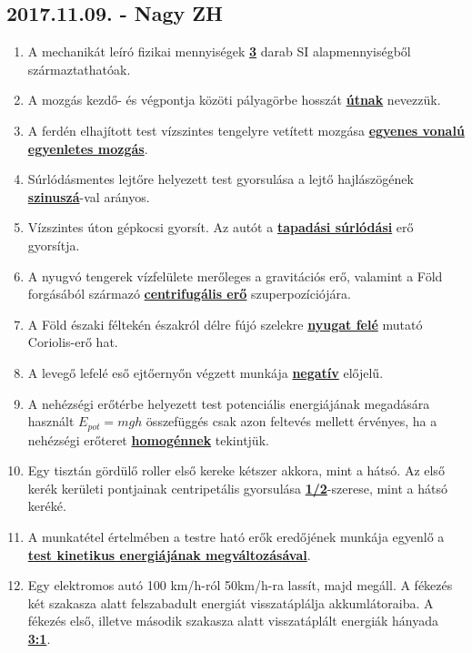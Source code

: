 \documentclass[../../fizika_kerdesek.tex]{subfiles}
\begin{document}
    \subsection{2017.11.09. - Nagy ZH}

        \begin{enumerate}
            \item A mechanikát leíró fizikai mennyiségek \underline{\textbf{3}} darab SI alapmennyiségből származtathatóak.
            \item A mozgás kezdő- és végpontja közöti pályagörbe hosszát \underline{\textbf{útnak}} nevezzük.
            \item A ferdén elhajított test vízszintes tengelyre vetített mozgása \underline{\textbf{egyenes vonalú egyenletes mozgás}}.
            \item Súrlódásmentes lejtőre helyezett test gyorsulása a lejtő hajlászögének \underline{\textbf{szinuszá}}-val arányos.
            \item Vízszintes úton gépkocsi gyorsít. Az autót a \underline{\textbf{tapadási súrlódási}} erő gyorsítja. 
            \sloppy\item A nyugvó tengerek vízfelülete merőleges a gravitációs erő, valamint a Föld forgásából származó \underline{\textbf{centrifugális erő}} szuperpozíciójára.
            \item A Föld északi féltekén északról délre fújó szelekre \underline{\textbf{nyugat felé}} mutató Coriolis-erő hat.
            \item A levegő lefelé eső ejtőernyőn végzett munkája \underline{\textbf{negatív}} előjelű.
            \item A nehézségi erőtérbe helyezett test potenciális energiájának megadására használt $E_{pot}=mgh$ összefüggés csak azon feltevés mellett érvényes, ha a nehézségi erőteret \underline{\textbf{homogénnek}} tekintjük.
            \item Egy tisztán gördülő roller első kereke kétszer akkora, mint a hátsó. Az első kerék kerületi pontjainak centripetális gyorsulása \underline{\textbf{1/2}}-szerese, mint a hátsó keréké.
            \item A munkatétel értelmében a testre ható erők eredőjének munkája egyenlő a \underline{\textbf{test kinetikus energiájának megváltozásával}}.
            \item Egy elektromos autó 100 km/h-ról 50km/h-ra lassít, majd megáll. A fékezés két szakasza alatt felszabadult energiát visszatáplálja akkumlátoraiba. A fékezés első, illetve második szakasza alatt visszatáplált energiák hányada \underline{\textbf{3:1}}.
        \end{enumerate}
\end{document}
